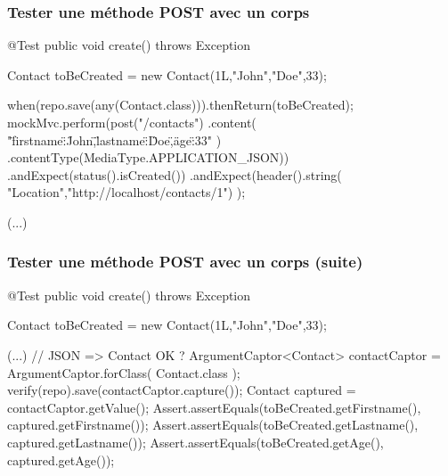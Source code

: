 \begin{frame}[fragile]
 \frametitle{Tester une méthode POST avec un corps}

 \begin{javacode}
@Test public void create() throws Exception {
    Contact toBeCreated = new Contact(1L,"John","Doe",33);

    when(repo.save(any(Contact.class))).thenReturn(toBeCreated);
    mockMvc.perform(post("/contacts")
        .content(
          "{\"firstname\":\"John\",\"lastname\":\"Doe\",\"age\":33}"
        )
        .contentType(MediaType.APPLICATION_JSON))
      .andExpect(status().isCreated())
      .andExpect(header().string(
         "Location","http://localhost/contacts/1")
      );

    (...)
}
 \end{javacode}

\end{frame}

\begin{frame}[fragile]
 \frametitle{Tester une méthode POST avec un corps (suite)}

 \begin{javacode}
@Test public void create() throws Exception {
    Contact toBeCreated = new Contact(1L,"John","Doe",33);

    (...)
    // JSON => Contact OK ?
    ArgumentCaptor<Contact> contactCaptor = ArgumentCaptor.forClass(
      Contact.class
    );
    verify(repo).save(contactCaptor.capture());
    Contact captured = contactCaptor.getValue();
    Assert.assertEquals(toBeCreated.getFirstname(),
      captured.getFirstname());
    Assert.assertEquals(toBeCreated.getLastname(),
      captured.getLastname());
    Assert.assertEquals(toBeCreated.getAge(),
      captured.getAge());
}
 \end{javacode}

\end{frame}

